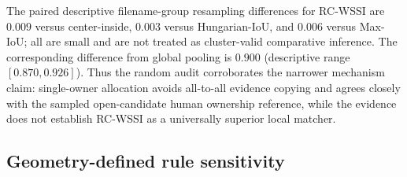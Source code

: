 \documentclass[iicol,pdflatex,sn-mathphys-num]{sn-jnl}
\begin{document}
\begin{table}[t]
\caption{Open-candidate, source-stratified random human ownership audit. The 66 pre-frozen images contain 334 PPE boxes from all 11 filename groups. Thirteen three-pass \texttt{AMBIGUOUS} rows are excluded before scoring, leaving 321 determinate owner rows. Exact requires equality of the predicted and blind-majority human owner sets. Brackets are descriptive filename-group resampling intervals, not cluster-valid confidence intervals.}
\label{tab:randomaudit}
\centering
\scriptsize
\setlength{\tabcolsep}{4pt}
\end{table}

The paired descriptive filename-group resampling differences for RC-WSSI are $0.009$ versus center-inside, $0.003$ versus Hungarian-IoU, and $0.006$ versus Max-IoU; all are small and are not treated as cluster-valid comparative inference. The corresponding difference from global pooling is $0.900$ (descriptive range $[0.870,0.926]$). Thus the random audit corroborates the narrower mechanism claim: single-owner allocation avoids all-to-all evidence copying and agrees closely with the sampled open-candidate human ownership reference, while the evidence does not establish RC-WSSI as a universally superior local matcher.

\subsection{Geometry-defined rule sensitivity}
\end{document}

